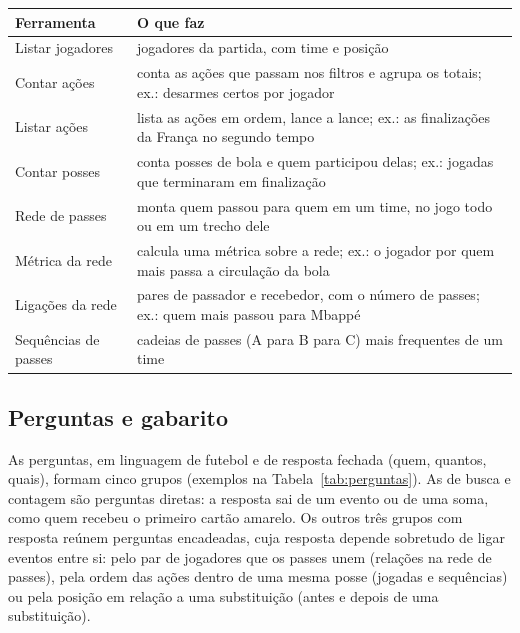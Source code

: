 \vspace{2mm}
\noindent\begin{minipage}{\columnwidth}
\centering\small\renewcommand{\arraystretch}{1.15}
\begin{tabular}{>{\raggedright\arraybackslash}p{}>{\raggedright\arraybackslash}p{}} %
\toprule
Ferramenta & O que faz \\
\midrule
Listar jogadores & jogadores da partida, com time e posição \\
Contar ações & conta as ações que passam nos filtros e agrupa os totais; ex.: desarmes certos por jogador \\
Listar ações & lista as ações em ordem, lance a lance; ex.: as finalizações da França no segundo tempo \\
Contar posses & conta posses de bola e quem participou delas; ex.: jogadas que terminaram em finalização \\
Rede de passes & monta quem passou para quem em um time, no jogo todo ou em um trecho dele \\
Métrica da rede & calcula uma métrica sobre a rede; ex.: o jogador por quem mais passa a circulação da bola \\
Ligações da rede & pares de passador e recebedor, com o número de passes; ex.: quem mais passou para Mbappé \\
Sequências de passes & cadeias de passes (A para B para C) mais frequentes de um time \\
\bottomrule
\end{tabular}
\label{tab:ferramentas}
\end{minipage}\par\smallskip



\subsection{Perguntas e gabarito}\label{sec:perguntas}

As perguntas, em linguagem de futebol e de resposta fechada (quem, quantos, quais), formam cinco grupos
(exemplos na Tabela~\ref{tab:perguntas}). As de busca e contagem são perguntas
diretas: a resposta sai de um evento ou de uma soma, como quem recebeu o primeiro cartão amarelo. Os outros três
grupos com resposta reúnem perguntas encadeadas, cuja resposta depende sobretudo de ligar eventos entre si: pelo
par de jogadores que os passes unem (relações na rede de passes), pela ordem das ações dentro de uma mesma posse
(jogadas e sequências) ou pela posição em relação a uma substituição (antes e depois de uma substituição).

